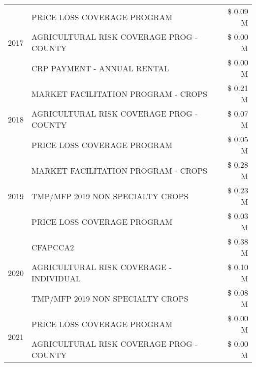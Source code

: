 \begin{tabular}{llr}
\cline{1-3}
\multirow[t]{3}{*}{2017} & PRICE LOSS COVERAGE PROGRAM & \$ 0.09 M \\
 & AGRICULTURAL RISK COVERAGE PROG - COUNTY & \$ 0.00 M \\
 & CRP PAYMENT - ANNUAL RENTAL & \$ 0.00 M \\
\cline{1-3}
\multirow[t]{3}{*}{2018} & MARKET FACILITATION PROGRAM - CROPS & \$ 0.21 M \\
 & AGRICULTURAL RISK COVERAGE PROG - COUNTY & \$ 0.07 M \\
 & PRICE LOSS COVERAGE PROGRAM & \$ 0.05 M \\
\cline{1-3}
\multirow[t]{3}{*}{2019} & MARKET FACILITATION PROGRAM - CROPS & \$ 0.28 M \\
 & TMP/MFP 2019 NON SPECIALTY CROPS & \$ 0.23 M \\
 & PRICE LOSS COVERAGE PROGRAM & \$ 0.03 M \\
\cline{1-3}
\multirow[t]{3}{*}{2020} & CFAPCCA2 & \$ 0.38 M \\
 & AGRICULTURAL RISK COVERAGE - INDIVIDUAL & \$ 0.10 M \\
 & TMP/MFP 2019 NON SPECIALTY CROPS & \$ 0.08 M \\
\cline{1-3}
\multirow[t]{2}{*}{2021} & PRICE LOSS COVERAGE PROGRAM & \$ 0.00 M \\
 & AGRICULTURAL RISK COVERAGE PROG - COUNTY & \$ 0.00 M \\
\cline{1-3}
\bottomrule
\end{tabular}
